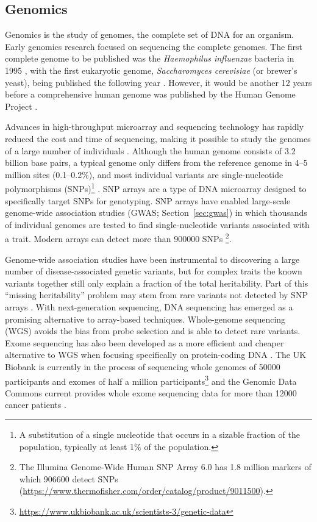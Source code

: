 \subsection{Genomics}
Genomics is the study of genomes, the complete set of DNA for an organism. Early genomics research focused on sequencing the complete genomes. The first complete genome to be published was the \emph{Haemophilus influenzae} bacteria in 1995 \cite{Fleischmann1995}, with the first eukaryotic genome, \emph{Saccharomyces cerevisiae} (or brewer's yeast), being published the following year \cite{Goffeau1996}. However, it would be another 12 years before a comprehensive human genome was published by the Human Genome Project \cite{Venter2001,Genome2004}.

Advances in high-throughput microarray and sequencing technology has rapidly reduced the cost and time of sequencing, making it possible to study the genomes of a large number of individuals \cite{Bumgarner2013,Reuter2015}. Although the human genome consists of 3.2 billion base pairs, a typical genome only differs from the reference genome in 4--5 million sites (0.1--0.2\%), and most individual variants are single-nucleotide polymorphisms (SNPs)\footnote{A substitution of a single nucleotide that occurs in a sizable fraction of the population, typically at least 1\% of the population.} \cite{genomes1k2015}.
SNP arrays are a type of DNA microarray designed to specifically target SNPs for genotyping. SNP arrays have enabled large-scale genome-wide association studies (GWAS; Section~\ref{sec:gwas}) in which thousands of individual genomes are tested to find single-nucleotide variants associated with a trait. Modern arrays can detect more than \num{900000} SNPs \footnote{The Illumina Genome-Wide Human SNP Array 6.0 has 1.8 million markers of which \num{906600} detect SNPs (\url{https://www.thermofisher.com/order/catalog/product/9011500}).}.

Genome-wide association studies have been instrumental to discovering a large number of disease-associated genetic variants, but for complex traits the known variants together still only explain a fraction of the total heritability. Part of this \enquote{missing heritability} problem may stem from rare variants not detected by SNP arrays \cite{Manolio2009,Lee2014}. With next-generation sequencing, DNA sequencing has emerged as a promising alternative to array-based techniques. Whole-genome sequencing (WGS) avoids the bias from probe selection and is able to detect rare variants. Exome sequencing has also been developed as a more efficient and cheaper alternative to WGS when focusing specifically on protein-coding DNA \cite{Suwinski2019}. The UK Biobank is currently in the process of sequencing whole genomes of \num{50000} participants and exomes of half a million participants\footnote{\url{https://www.ukbiobank.ac.uk/scientists-3/genetic-data}} and the Genomic Data Commons current provides whole exome sequencing data for more than \num{12000} cancer patients \cite{Gao2019}.

